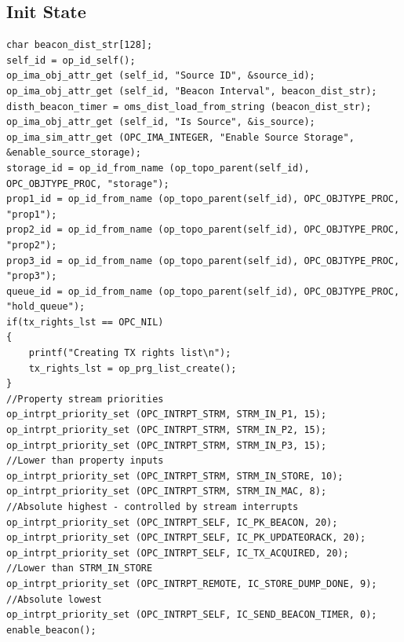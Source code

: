 \subsection{Init State}
{\tiny
\begin{verbatim}
char beacon_dist_str[128];
self_id = op_id_self();
op_ima_obj_attr_get (self_id, "Source ID", &source_id);
op_ima_obj_attr_get (self_id, "Beacon Interval", beacon_dist_str);
disth_beacon_timer = oms_dist_load_from_string (beacon_dist_str);
op_ima_obj_attr_get (self_id, "Is Source", &is_source);
op_ima_sim_attr_get (OPC_IMA_INTEGER, "Enable Source Storage", &enable_source_storage);
storage_id = op_id_from_name (op_topo_parent(self_id), OPC_OBJTYPE_PROC, "storage");
prop1_id = op_id_from_name (op_topo_parent(self_id), OPC_OBJTYPE_PROC, "prop1");
prop2_id = op_id_from_name (op_topo_parent(self_id), OPC_OBJTYPE_PROC, "prop2");
prop3_id = op_id_from_name (op_topo_parent(self_id), OPC_OBJTYPE_PROC, "prop3");
queue_id = op_id_from_name (op_topo_parent(self_id), OPC_OBJTYPE_PROC, "hold_queue");
if(tx_rights_lst == OPC_NIL)
{
	printf("Creating TX rights list\n");
	tx_rights_lst = op_prg_list_create();
}
//Property stream priorities
op_intrpt_priority_set (OPC_INTRPT_STRM, STRM_IN_P1, 15);
op_intrpt_priority_set (OPC_INTRPT_STRM, STRM_IN_P2, 15);
op_intrpt_priority_set (OPC_INTRPT_STRM, STRM_IN_P3, 15);
//Lower than property inputs
op_intrpt_priority_set (OPC_INTRPT_STRM, STRM_IN_STORE, 10);
op_intrpt_priority_set (OPC_INTRPT_STRM, STRM_IN_MAC, 8);
//Absolute highest - controlled by stream interrupts
op_intrpt_priority_set (OPC_INTRPT_SELF, IC_PK_BEACON, 20);
op_intrpt_priority_set (OPC_INTRPT_SELF, IC_PK_UPDATEORACK, 20);
op_intrpt_priority_set (OPC_INTRPT_SELF, IC_TX_ACQUIRED, 20);
//Lower than STRM_IN_STORE
op_intrpt_priority_set (OPC_INTRPT_REMOTE, IC_STORE_DUMP_DONE, 9);
//Absolute lowest
op_intrpt_priority_set (OPC_INTRPT_SELF, IC_SEND_BEACON_TIMER, 0);
enable_beacon();
\end{verbatim}
}

